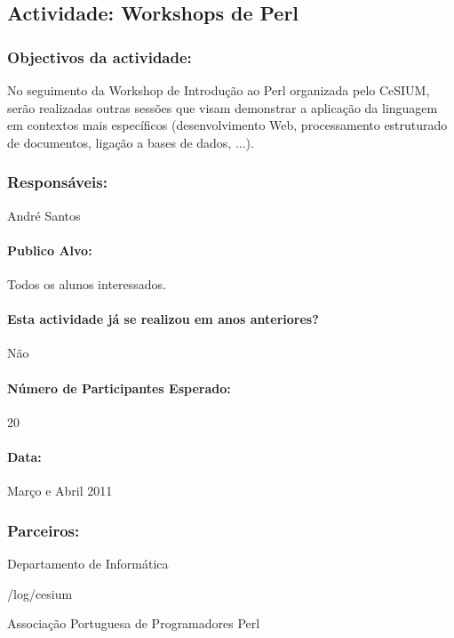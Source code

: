 \subsection{Actividade: Workshops de Perl} %

\subsubsection*{Objectivos da actividade:}
No seguimento da Workshop de Introdução ao Perl organizada pelo CeSIUM, serão realizadas outras sessões que visam demonstrar a aplicação da linguagem em contextos mais específicos (desenvolvimento Web, processamento estruturado de documentos, ligação a bases de dados, ...).

\subsubsection*{Responsáveis:}
\begin{itemizedash}
	\item{André Santos}
\end{itemizedash}

\paragraph{Publico Alvo: }
Todos os alunos interessados.

\paragraph{Esta actividade já se realizou em anos anteriores?}
Não

\paragraph{Número de Participantes Esperado:}
20

\paragraph{Data:} Março e Abril 2011

\subsubsection*{Parceiros:}
\begin{itemizedash}
    \item{Departamento de Informática}
	\item{/log/cesium}
	\item{Associação Portuguesa de Programadores Perl}
\end{itemizedash}

